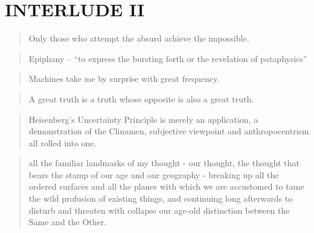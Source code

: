
\pagestyle{empty}

\chapter*{INTERLUDE II}
\label{interlude2}



\begin{quotation}
    Only those who attempt the absurd achieve the impossible. 
\end{quotation}

\begin{quotation}
    Epiphany – ``to express the bursting forth or the revelation of pataphysics'' 
\end{quotation}

\begin{quotation}
    Machines take me by surprise with great frequency.
\end{quotation}

\begin{quotation}
    A great truth is a truth whose opposite is also a great truth. 
\end{quotation}

\begin{quotation}
    Heisenberg's Uncertainty Principle is merely an application, a demonstration of the Clinamen, subjective viewpoint and anthropocentrism all rolled into one. 
\end{quotation}

\begin{quotation}
  all the familiar landmarks of my thought - our thought, the thought that bears the stamp of our age and our geography - breaking up all the ordered surfaces and all the planes with which we are accustomed to tame the wild profusion of existing things, and continuing long afterwards to disturb and threaten with collapse our age-old distinction between the Same and the Other. 
\end{quotation}


\pagestyle{fania}


\clearpage